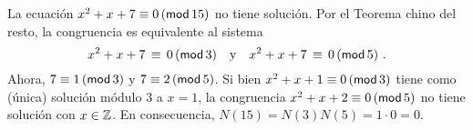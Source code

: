 
\begin{ejemChino}\label{ejem:chino:polinomial:quince}
	La ecuaci\'on $x^2+x+7\equiv 0\tmodulo[15]$ no tiene soluci\'on.
	Por el Teorema chino del resto, la congruencia es equivalente al
	sistema
	\begin{displaymath}
		x^2+x+7\,\equiv\,0\tmodulo[3]\dispand
		x^2+x+7\,\equiv\,0\tmodulo[5]
		\dispstop
	\end{displaymath}
	Ahora, $7\equiv 1\tmodulo[3]$ y $7\equiv 2\tmodulo[5]$.
	Si bien $x^2+x+1\equiv 0\tmodulo[3]$ tiene como (\'unica)
	soluci\'on m\'odulo $3$ a $x=1$, la
	congruencia $x^2+x+2\equiv 0\tmodulo[5]$ no tiene soluci\'on
	con $x\in\Enteros$.
	En consecuencia, $N(15)=N(3)N(5)=1\cdot 0=0$.
\end{ejemChino}


